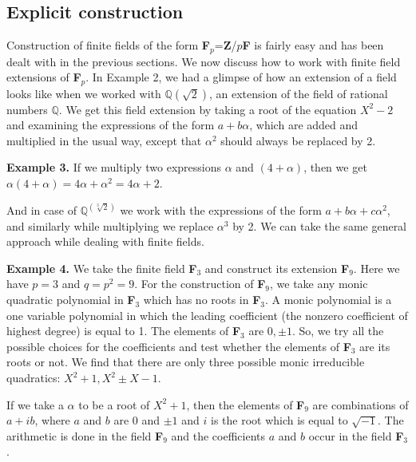 \documentclass[12pt]{article}
\begin{document}
        \subsection{Explicit construction}
Construction of finite fields of the form \textbf{F}$_p$=\textbf{Z}/$p$\textbf{F} is fairly easy and has been dealt with in the previous sections. We now discuss how to work with finite field extensions of \textbf{F}$_p$. In Example 2, we had a glimpse of how an extension of a field looks like when we worked with $\mathbb{Q}(\sqrt{2})$, an extension of the field of rational numbers $\mathbb{Q}$. We get this field extension by taking a root of the equation $X^2-2$ and examining the expressions of the form $a+b\alpha$, which are added and multiplied in the usual way, except that $\alpha^2$  should always be replaced by 2.

\textbf{Example 3.} If we multiply two expressions $\alpha$ and $(4+\alpha)$, then we get $\alpha(4+\alpha)=4\alpha+\alpha^2=4\alpha+2$.

And in case of $\mathbb{Q}^(\sqrt[3]{2})$ we work with the expressions of the form $a+b\alpha+c\alpha^2$, and similarly while multiplying we replace $\alpha^3$ by 2. We can take the same general approach while dealing with finite fields.

\textbf{Example 4.}
We take the finite field \textbf{F}$_3$ and construct its extension \textbf{F}$_9$. Here we have $p=3$ and $q=p^2=9$. For the construction of \textbf{F}$_9$, we take any monic quadratic polynomial in \textbf{F}$_3$ which has no roots in \textbf{F}$_3$. A monic polynomial is a one variable polynomial in which the leading coefficient (the nonzero coefficient of highest degree) is equal to 1. The elements of \textbf{F}$_3$ are $0,\pm1$. So, we try all the possible choices for the coefficients and test whether the elements of \textbf{F}$_3$ are its roots or not. We find that there are only three possible monic irreducible quadratics: $X^2+1, X^2\pm X-1$.

If we take a $\alpha$ to  be a root of $X^2+1$, then the elements of \textbf{F}$_9$ are combinations of $a+ib$, where $a$ and $b$ are $0$ and $\pm 1$ and $i$ is the root which is equal to $\sqrt{-1}$. The arithmetic is done in the field \textbf{F}$_9$ and the coefficients $a$ and $b$ occur in the field \textbf{F}$_3$.
\end{document}

